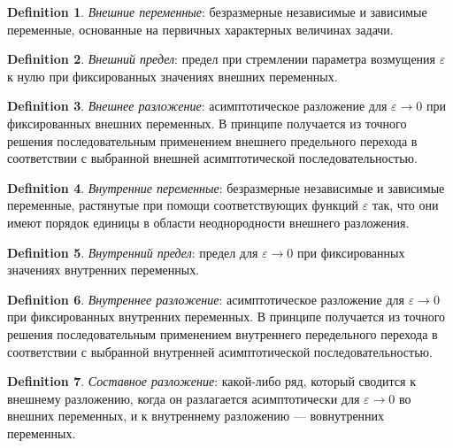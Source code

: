 \documentclass[12pt,a4paper,titlepage]{article}
\theoremstyle{definition}
\newtheorem{definition}{Definition}[section]
\theoremstyle{remark}
\begin{document}
  \theoremstyle{definition}
  \begin{definition}
    \textit{Внешние переменные}: безразмерные независимые и зависимые переменные,
    основанные на первичных характерных величинах задачи.
  \end{definition}

  \theoremstyle{definition}
  \begin{definition}
    \textit{Внешний предел}:
    предел при стремлении параметра возмущения $\varepsilon$ к нулю
    при фиксированных значениях внешних переменных.
  \end{definition}

  \theoremstyle{definition}
  \begin{definition}
    \textit{Внешнее разложение}: асимптотическое разложение для
    $\varepsilon \rightarrow 0$ при фиксированных внешних переменных.
    В принципе получается из точного решения последовательным применением
    внешнего предельного перехода в соответствии с выбранной
    внешней асимптотической последовательностью.  
  \end{definition}

  \theoremstyle{definition}
  \begin{definition}
    \textit{Внутренние переменные}: безразмерные независимые и зависимые переменные,
    растянутые при помощи соответствующих функций $\varepsilon$ так,
    что они имеют порядок единицы в области неоднородности внешнего разложения.
  \end{definition}
  \theoremstyle{definition}
  \begin{definition}
    \textit{Внутренний предел}: предел для $\varepsilon \rightarrow 0$
    при фиксированных значениях внутренних переменных.
  \end{definition}

  \theoremstyle{definition}
  \begin{definition}
    \textit{Внутреннее разложение}: асимптотическое разложение для
    $\varepsilon \rightarrow 0$
    при фиксированных внутренних переменных.
    В принципе получается из точного решения последовательным применением
    внутреннего передельного перехода в соответствии с выбранной внутренней
    асимптотической последовательностью.
  \end{definition}

  \theoremstyle{definition}
  \begin{definition}
    \textit{Составное разложение}: какой-либо ряд,
    который сводится к внешнему разложению,
    когда он разлагается асимптотически для $\varepsilon \rightarrow 0$
    во внешних переменных,
    и к внутреннему разложению — вовнутренних переменных.
  \end{definition}
\end{document}
